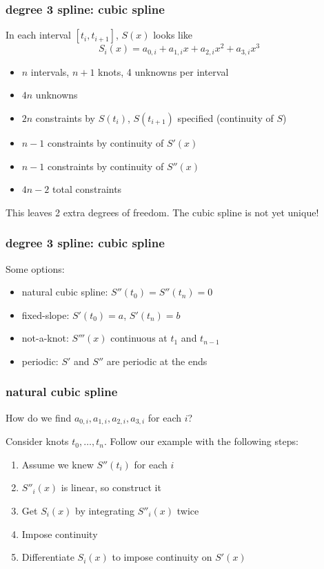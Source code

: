 \documentclass[10pt]{beamer}
\begin{document}
\begin{frame}
\frametitle{degree 3 spline: cubic spline}
In each interval $[t_i,t_{i+1}]$, $S(x)$ looks like
\begin{equation*}
  S_i(x) = a_{0,i} + a_{1,i}x + a_{2,i}x^2 + a_{3,i}x^3
\end{equation*}
\begin{itemize}
  \item $n$ intervals, $n+1$ knots, 4 unknowns per interval
  \item $4n$ unknowns
  \item $2n$ constraints by $S(t_i)$, $S(t_{i+1})$ specified (continuity of $S$)
  \item $n-1$ constraints by continuity of $S'(x)$
  \item $n-1$ constraints by continuity of $S''(x)$
  \item $4n-2$ total constraints
\end{itemize}
This leaves 2 extra degrees of freedom.  The cubic spline is not yet
unique!
\end{frame}
\begin{frame}
\frametitle{degree 3 spline: cubic spline}
Some options:
  \begin{itemize}
    \item natural cubic spline: $S''(t_0)=S''(t_n)=0$
    \item fixed-slope: $S'(t_0)=a$, $S'(t_n)=b$
    \item not-a-knot: $S'''(x)$ continuous at $t_1$ and $t_{n-1}$
    \item periodic: $S'$ and $S''$ are periodic at the ends
  \end{itemize}
\end{frame}
\begin{frame}
\frametitle{natural cubic spline}
How do we find $a_{0,i}, a_{1,i}, a_{2,i}, a_{3,i}$ for each $i$?

\bigskip

Consider knots $t_0,\dots,t_n$.  Follow our example with the following
steps:
\begin{enumerate}
  \item Assume we knew $S''(t_i)$ for each $i$
  \item $S''_i(x)$ is linear, so construct it
  \item Get $S_i(x)$ by integrating $S''_i(x)$ twice
  \item Impose continuity
  \item Differentiate $S_i(x)$ to impose continuity on $S'(x)$
\end{enumerate}

\end{frame}
\end{document}
